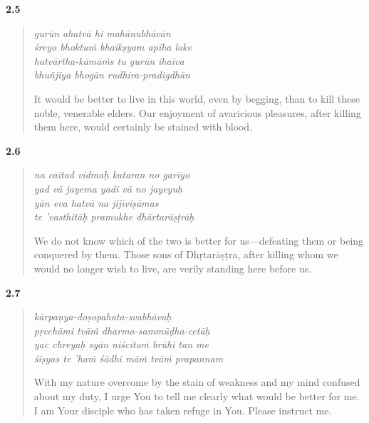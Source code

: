 \par\noindent\textbf{2.5}\par
\begin{verse}
\textit{gurūn ahatvā hi mahānubhāvān} \\
\textit{śreyo bhoktuṁ bhaikṣyam apīha loke} \\
\textit{hatvārtha-kāmāṁs tu gurūn ihaiva} \\
\textit{bhuñjīya bhogān rudhira-pradigdhān}

\noindent It would be better to live in this world, even by begging, than to kill these noble, venerable elders. Our enjoyment of avaricious pleasures, after killing them here, would certainly be stained with blood.
\end{verse}
\par



\par\noindent\textbf{2.6}\par
\begin{verse}
\textit{na caitad vidmaḥ kataran no garīyo} \\
\textit{yad vā jayema yadi vā no jayeyuḥ} \\
\textit{yān eva hatvā na jijīviṣāmas} \\
\textit{te ’vasthitāḥ pramukhe dhārtarāṣṭrāḥ}

\noindent We do not know which of the two is better for us---defeating them or being conquered by them. Those sons of Dhṛtarāṣṭra, after killing whom we would no longer wish to live, are verily standing here before us.
\end{verse}
\par



\par\noindent\textbf{2.7}\par
\begin{verse}
\textit{kārpaṇya-doṣopahata-svabhāvaḥ} \\
\textit{pṛcchāmi tvāṁ dharma-sammūḍha-cetāḥ} \\
\textit{yac chreyaḥ syān niścitaṁ brūhi tan me} \\
\textit{śiṣyas te ’haṁ śādhi māṁ tvāṁ prapannam}

\noindent With my nature overcome by the stain of weakness and my mind confused about my duty, I urge You to tell me clearly what would be better for me. I am Your disciple who has taken refuge in You. Please instruct me.
\end{verse}
\par



